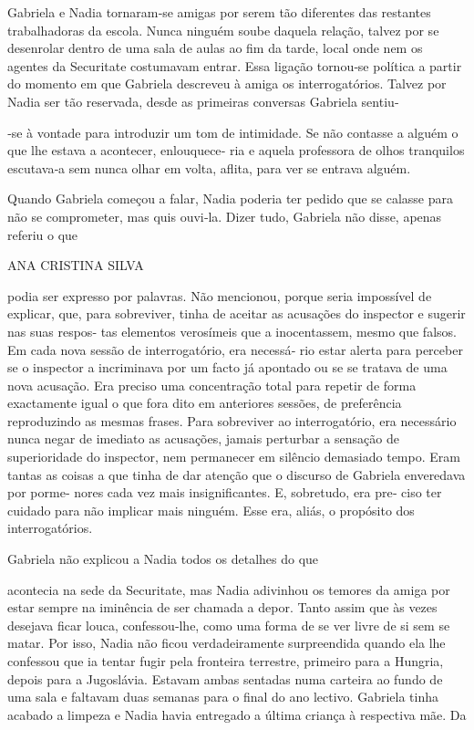 Gabriela e Nadia tornaram‑se amigas por serem tão diferentes das
restantes trabalhadoras da escola. Nunca ninguém soube daquela relação,
talvez por se desenrolar dentro de uma sala de aulas ao fim da tarde,
local onde nem os agentes da Securitate costumavam entrar. Essa ligação
tornou‑se política a partir do momento em que Gabriela descreveu à amiga
os interrogatórios. Talvez por Nadia ser tão reservada, desde as
primeiras conversas Gabriela sentiu‑

‑se à vontade para introduzir um tom de intimidade. Se não contasse a
alguém o que lhe estava a acontecer, enlouquece‑ ria e aquela professora
de olhos tranquilos escutava‑a sem nunca olhar em volta, aflita, para
ver se entrava alguém.

Quando Gabriela começou a falar, Nadia poderia ter pedido que se calasse
para não se comprometer, mas quis ouvi‑la. Dizer tudo, Gabriela não
disse, apenas referiu o que

ANA CRISTINA SILVA

podia ser expresso por palavras. Não mencionou, porque seria impossível
de explicar, que, para sobreviver, tinha de aceitar as acusações do
inspector e sugerir nas suas respos‑ tas elementos verosímeis que a
inocentassem, mesmo que falsos. Em cada nova sessão de interrogatório,
era necessá‑ rio estar alerta para perceber se o inspector a incriminava
por um facto já apontado ou se se tratava de uma nova acusação. Era
preciso uma concentração total para repetir de forma exactamente igual o
que fora dito em anteriores sessões, de preferência reproduzindo as
mesmas frases. Para sobreviver ao interrogatório, era necessário nunca
negar de imediato as acusações, jamais perturbar a sensação de
superioridade do inspector, nem permanecer em silêncio demasiado tempo.
Eram tantas as coisas a que tinha de dar atenção que o discurso de
Gabriela enveredava por porme‑ nores cada vez mais insignificantes. E,
sobretudo, era pre‑ ciso ter cuidado para não implicar mais ninguém.
Esse era, aliás, o propósito dos interrogatórios.

Gabriela não explicou a Nadia todos os detalhes do que

acontecia na sede da Securitate, mas Nadia adivinhou os temores da amiga
por estar sempre na iminência de ser chamada a depor. Tanto assim que às
vezes desejava ficar louca, confessou‑lhe, como uma forma de se ver
livre de si sem se matar. Por isso, Nadia não ficou verdadeiramente
surpreendida quando ela lhe confessou que ia tentar fugir pela fronteira
terrestre, primeiro para a Hungria, depois para a Jugoslávia. Estavam
ambas sentadas numa carteira ao fundo de uma sala e faltavam duas
semanas para o final do ano lectivo. Gabriela tinha acabado a limpeza e
Nadia havia entregado a última criança à respectiva mãe. Da

